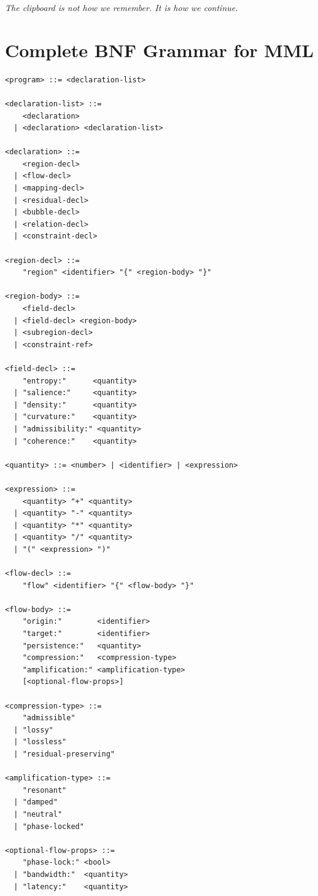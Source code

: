 \documentclass[12pt,oneside]{book}
\theoremstyle{plain}
\theoremstyle{definition}
\theoremstyle{plain}
\begin{document}
\vspace{1em}
\noindent\textit{The clipboard is not how we remember. It is how we continue.}


\appendix

\chapter{Complete BNF Grammar for MML}
\label{app:mml_grammar}

\begin{lstlisting}
<program> ::= <declaration-list>

<declaration-list> ::=
    <declaration>
  | <declaration> <declaration-list>

<declaration> ::=
    <region-decl>
  | <flow-decl>
  | <mapping-decl>
  | <residual-decl>
  | <bubble-decl>
  | <relation-decl>
  | <constraint-decl>

<region-decl> ::=
    "region" <identifier> "{" <region-body> "}"

<region-body> ::=
    <field-decl>
  | <field-decl> <region-body>
  | <subregion-decl>
  | <constraint-ref>

<field-decl> ::=
    "entropy:"      <quantity>
  | "salience:"     <quantity>
  | "density:"      <quantity>
  | "curvature:"    <quantity>
  | "admissibility:" <quantity>
  | "coherence:"    <quantity>

<quantity> ::= <number> | <identifier> | <expression>

<expression> ::=
    <quantity> "+" <quantity>
  | <quantity> "-" <quantity>
  | <quantity> "*" <quantity>
  | <quantity> "/" <quantity>
  | "(" <expression> ")"

<flow-decl> ::=
    "flow" <identifier> "{" <flow-body> "}"

<flow-body> ::=
    "origin:"        <identifier>
    "target:"        <identifier>
    "persistence:"   <quantity>
    "compression:"   <compression-type>
    "amplification:" <amplification-type>
    [<optional-flow-props>]

<compression-type> ::=
    "admissible"
  | "lossy"
  | "lossless"
  | "residual-preserving"

<amplification-type> ::=
    "resonant"
  | "damped"
  | "neutral"
  | "phase-locked"

<optional-flow-props> ::=
    "phase-lock:" <bool>
  | "bandwidth:"  <quantity>
  | "latency:"    <quantity>


\end{lstlisting}
\end{document}
